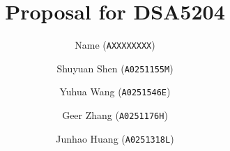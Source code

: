\author{
  Name (\texttt{AXXXXXXXX})
  \and
 Shuyuan Shen (\texttt{A0251155M})
  \and
  Yuhua Wang (\texttt{A0251546E})
  \and
  Geer Zhang (\texttt{A0251176H})
  \and
  Junhao Huang (\texttt{A0251318L})
}

\title{Proposal for DSA5204}  %
\date{}
